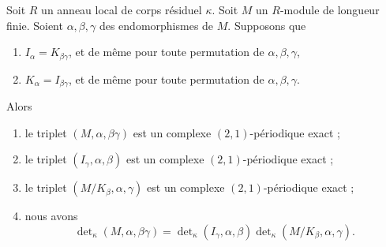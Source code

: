\begin{lemma}
\label{lemma-multiplicativity-determinant}
Soit $R$ un anneau local de corps résiduel $\kappa$.
Soit $M$ un $R$-module de longueur finie.
Soient $\alpha, \beta, \gamma$ des endomorphismes de $M$.
Supposons que
\begin{enumerate}
\item $I_\alpha = K_{\beta\gamma}$, et de même pour toute permutation
de $\alpha, \beta, \gamma$,
\item $K_\alpha = I_{\beta\gamma}$, et de même pour toute permutation
de $\alpha, \beta, \gamma$.
\end{enumerate}
Alors
\begin{enumerate}
\item le triplet $(M, \alpha, \beta\gamma)$
est un complexe $(2, 1)$-périodique exact ;
\item le triplet $(I_\gamma, \alpha, \beta)$
est un complexe $(2, 1)$-périodique exact ;
\item le triplet $(M/K_\beta, \alpha, \gamma)$
est un complexe $(2, 1)$-périodique exact ;
\item nous avons
$$
\det\nolimits_\kappa(M, \alpha, \beta\gamma)
=
\det\nolimits_\kappa(I_\gamma, \alpha, \beta)
\det\nolimits_\kappa(M/K_\beta, \alpha, \gamma).
$$
\end{enumerate}
\end{lemma}

